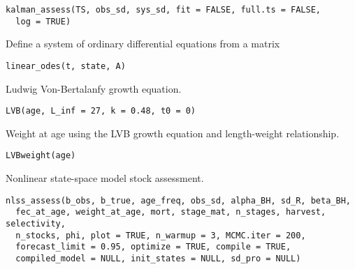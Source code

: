 \documentclass[letterpaper]{book}
\begin{document}
%
\begin{Usage}
\begin{verbatim}
kalman_assess(TS, obs_sd, sys_sd, fit = FALSE, full.ts = FALSE,
  log = TRUE)
\end{verbatim}
\end{Usage}
%
\begin{Description}\relax
Define a system of ordinary differential equations from a matrix
\end{Description}
%
\begin{Usage}
\begin{verbatim}
linear_odes(t, state, A)
\end{verbatim}
\end{Usage}
%
\begin{Description}\relax
Ludwig Von-Bertalanfy growth equation.
\end{Description}
%
\begin{Usage}
\begin{verbatim}
LVB(age, L_inf = 27, k = 0.48, t0 = 0)
\end{verbatim}
\end{Usage}
%
\begin{Description}\relax
Weight at age using the LVB growth equation and length-weight relationship.
\end{Description}
%
\begin{Usage}
\begin{verbatim}
LVBweight(age)
\end{verbatim}
\end{Usage}
%
\begin{Description}\relax
Nonlinear state-space model stock assessment.
\end{Description}
%
\begin{Usage}
\begin{verbatim}
nlss_assess(b_obs, b_true, age_freq, obs_sd, alpha_BH, sd_R, beta_BH,
  fec_at_age, weight_at_age, mort, stage_mat, n_stages, harvest, selectivity,
  n_stocks, phi, plot = TRUE, n_warmup = 3, MCMC.iter = 200,
  forecast_limit = 0.95, optimize = TRUE, compile = TRUE,
  compiled_model = NULL, init_states = NULL, sd_pro = NULL)
\end{verbatim}
\end{Usage}
\end{document}
